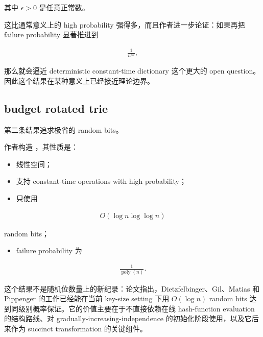 \documentclass[12pt]{article}
\begin{document}
其中 \(\epsilon > 0\) 是任意正常数\cite[Theorem~2]{kuszmaul2022}。

这比通常意义上的 high probability 强得多，而且作者进一步论证：如果再把 failure probability 显著推进到

\[\begin{aligned}
\frac{1}{n^{\epsilon n}},
\end{aligned}\]

那么就会逼近 deterministic constant-time dictionary 这个更大的 open question。因此这个结果在某种意义上已经接近理论边界\cite[Lemma~3]{kuszmaul2022}。

\subsection{budget rotated trie}

第二条结果追求极省的 random bits。

作者构造 \texttt{}，其性质是：

\begin{itemize}

\item 线性空间；

\item 支持 constant-time operations with high probability；

\item 只使用

\end{itemize}

\[\begin{aligned}
O(\log n \log \log n)
\end{aligned}\]

random bits\cite[Theorem~5]{kuszmaul2022}；

\begin{itemize}

\item failure probability 为

\end{itemize}

\[\begin{aligned}
\frac{1}{\operatorname{poly}(n)}.
\end{aligned}\]

这个结果不是随机位数量上的新纪录：论文指出，Dietzfelbinger、Gil、Matias 和 Pippenger 的工作已经能在当前 key-size setting 下用 \(O(\log n)\) random bits 达到同级别概率保证\cite[Sec.~5]{kuszmaul2022}\cite{dietzfelbinger1992}。它的价值主要在于不直接依赖在线 hash-function evaluation 的结构路线、对 gradually-increasing-independence 的初始化阶段使用，以及它后来作为 succinct transformation 的关键组件。
\end{document}
